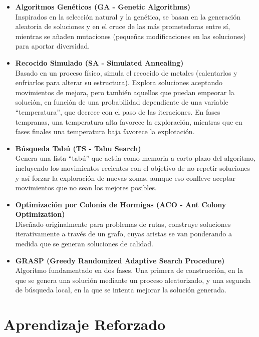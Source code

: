 \documentclass[12pt,a4paper]{book}
\begin{document}
\begin{itemize}
    \item \textbf{Algoritmos Genéticos (GA - Genetic Algorithms)}\\
    Inspirados en la selección natural y la genética, se basan en la generación aleatoria de soluciones y en el cruce de las más prometedoras entre sí, 
    mientras se añaden mutaciones (pequeñas modificaciones en las soluciones) para aportar diversidad.
    
    \item \textbf{Recocido Simulado (SA - Simulated Annealing)}\\
    Basado en un proceso físico, simula el recocido de metales (calentarlos y enfriarlos para alterar su estructura). Explora soluciones aceptando movimientos de mejora, pero también aquellos que puedan empeorar la solución, 
    en función de una probabilidad dependiente de una variable ``temperatura'', que decrece con el paso de las iteraciones. En fases tempranas, una temperatura alta favorece la exploración, mientras que en fases finales una temperatura baja favorece la explotación.
    
    \item \textbf{Búsqueda Tabú (TS - Tabu Search)}\\
    Genera una lista ``tabú'' que actúa como memoria a corto plazo del algoritmo, incluyendo los movimientos recientes con el objetivo de no repetir soluciones y así forzar la exploración de nuevas zonas, aunque eso conlleve aceptar movimientos que no sean los mejores posibles.
    
    \item \textbf{Optimización por Colonia de Hormigas (ACO - Ant Colony Optimization)}\\
    Diseñado originalmente para problemas de rutas, construye soluciones iterativamente a través de un grafo, cuyas aristas se van ponderando a medida que se generan soluciones de calidad.
    
    \item \textbf{GRASP (Greedy Randomized Adaptive Search Procedure)}\\
    Algoritmo fundamentado en dos fases. Una primera de construcción, en la que se genera una solución mediante un proceso aleatorizado, y una segunda de búsqueda local, en la que se intenta mejorar la solución generada.
\end{itemize}

\section{Aprendizaje Reforzado}
\end{document}
